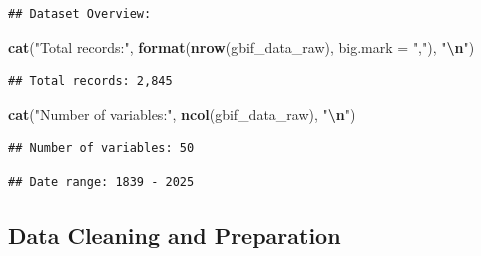 \documentclass[
]{article}
\newenvironment{Shaded}{\begin{snugshade}}{\end{snugshade}}
\newcommand{\AttributeTok}[1]{\textcolor[rgb]{0.13,0.29,0.53}{#1}}
\newcommand{\ConstantTok}[1]{\textcolor[rgb]{0.56,0.35,0.01}{#1}}
\newcommand{\FunctionTok}[1]{\textcolor[rgb]{0.13,0.29,0.53}{\textbf{#1}}}
\newcommand{\NormalTok}[1]{#1}
\newcommand{\SpecialCharTok}[1]{\textcolor[rgb]{0.81,0.36,0.00}{\textbf{#1}}}
\newcommand{\StringTok}[1]{\textcolor[rgb]{0.31,0.60,0.02}{#1}}
\begin{document}
\begin{verbatim}
## Dataset Overview:
\end{verbatim}

\begin{Shaded}
\begin{Highlighting}[]
\FunctionTok{cat}\NormalTok{(}\StringTok{"Total records:"}\NormalTok{, }\FunctionTok{format}\NormalTok{(}\FunctionTok{nrow}\NormalTok{(gbif\_data\_raw), }\AttributeTok{big.mark =} \StringTok{","}\NormalTok{), }\StringTok{"}\SpecialCharTok{\textbackslash{}n}\StringTok{"}\NormalTok{)}
\end{Highlighting}
\end{Shaded}

\begin{verbatim}
## Total records: 2,845
\end{verbatim}

\begin{Shaded}
\begin{Highlighting}[]
\FunctionTok{cat}\NormalTok{(}\StringTok{"Number of variables:"}\NormalTok{, }\FunctionTok{ncol}\NormalTok{(gbif\_data\_raw), }\StringTok{"}\SpecialCharTok{\textbackslash{}n}\StringTok{"}\NormalTok{)}
\end{Highlighting}
\end{Shaded}

\begin{verbatim}
## Number of variables: 50
\end{verbatim}

\begin{Shaded}
\end{Shaded}

\begin{verbatim}
## Date range: 1839 - 2025
\end{verbatim}

\subsection{Data Cleaning and
Preparation}\label{data-cleaning-and-preparation}
\end{document}
